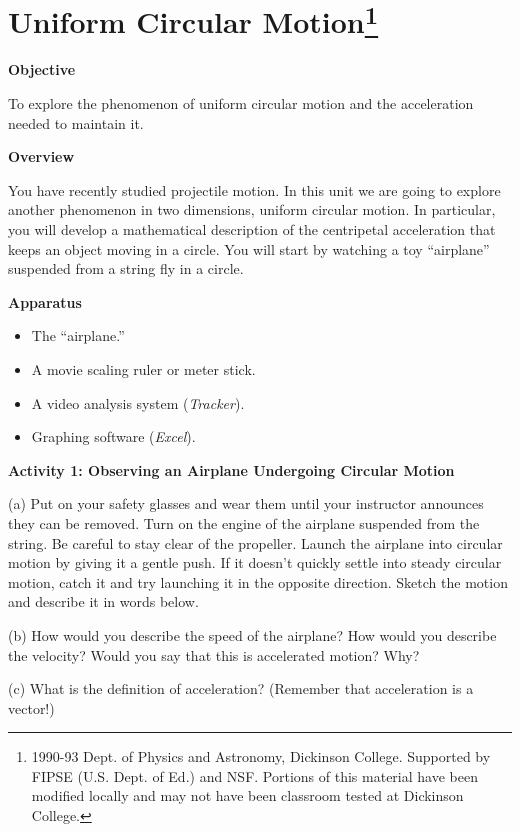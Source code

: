 
\section{Uniform Circular Motion\footnote{
1990-93 Dept. of Physics and Astronomy, Dickinson College. Supported by FIPSE
(U.S. Dept. of Ed.) and NSF. Portions of this material have been modified locally
and may not have been classroom tested at Dickinson College.
}}

\makelabheader %

\textbf{Objective }

To explore the phenomenon of uniform circular motion and the acceleration needed
to maintain it.

\textbf{Overview} 

You have recently studied projectile motion. In this unit we are going to explore
another phenomenon in two dimensions, uniform circular motion. In particular,
you will develop a mathematical description of the centripetal acceleration
that keeps an object moving in a circle. You will start by watching a toy ``airplane''
suspended from a string fly in a circle.

\textbf{Apparatus}

\begin{itemize}
\item The ``airplane.''
\item A movie scaling ruler or meter stick.
\item A video analysis system (\textit{Tracker}). 
\item Graphing software (\textit{Excel}).
\end{itemize}
\textbf{Activity 1: Observing an Airplane Undergoing Circular Motion} 

(a) Put on your safety glasses and wear them until your instructor announces
they can be removed. Turn on the engine of the airplane suspended from
the string. Be careful to stay clear of the propeller. Launch the airplane into
circular motion by giving it a gentle push. If it doesn't quickly settle into
steady circular motion, catch it and try launching it in the opposite direction.
Sketch the motion and describe it in words below. 
\answerspace{30mm}

(b) How would you describe the speed of the airplane? How would you
describe the velocity? Would you say that this is accelerated motion? Why?
\answerspace{15mm}

(c) What is the definition of acceleration? (Remember that acceleration is a vector!)
\answerspace{15mm}

